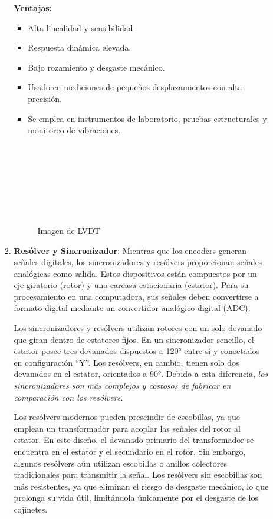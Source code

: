 \begin{enumerate}
\begin{enumerate}
\begin{enumerate}
		\textbf{Ventajas:}
		\begin{itemize}
			\item Alta linealidad y sensibilidad.
			\item Respuesta dinámica elevada.
			\item Bajo rozamiento y desgaste mecánico.
			\item Usado en mediciones de pequeños desplazamientos con alta precisión.
			\item Se emplea en instrumentos de laboratorio, pruebas estructurales y monitoreo de vibraciones.
			\\
			\\
			\\
			\\
			\\
			\\
			\\
			\\
		\end{itemize}
		
		\begin{figure}[!h]
			\centering
			\caption{Imagen de LVDT}
			\label{fig:figura_sensores}
		\end{figure}
\medspace		

			
			\item \textbf{Resólver y Sincronizador}: Mientras que los encoders generan señales digitales, los sincronizadores y resólvers proporcionan señales analógicas como salida. Estos dispositivos están compuestos por un eje giratorio (rotor) y una carcasa estacionaria (estator). Para su procesamiento en una computadora, sus señales deben convertirse a formato digital mediante un convertidor analógico-digital (ADC).
			
			 Los sincronizadores y resólvers utilizan rotores con un solo devanado que giran dentro de estatores fijos. En un sincronizador sencillo, el estator posee tres devanados dispuestos a 120° entre sí y conectados en configuración “Y”. Los resólvers, en cambio, tienen solo dos devanados en el estator, orientados a 90°. Debido a esta diferencia, \textit {los sincronizadores son más complejos y costosos de fabricar en comparación con los resólvers.}
			
			Los resólvers modernos pueden prescindir de escobillas, ya que emplean un transformador para acoplar las señales del rotor al estator. En este diseño, el devanado primario del transformador se encuentra en el estator y el secundario en el rotor. Sin embargo, algunos resólvers aún utilizan escobillas o anillos colectores tradicionales para transmitir la señal. Los resólvers sin escobillas son más resistentes, ya que eliminan el riesgo de desgaste mecánico, lo que prolonga su vida útil, limitándola únicamente por el desgaste de los cojinetes.\cite{saha2010robotics} \\
			\\
			\\
			\\
			\\


\end{enumerate}
\end{enumerate}
\end{enumerate}
